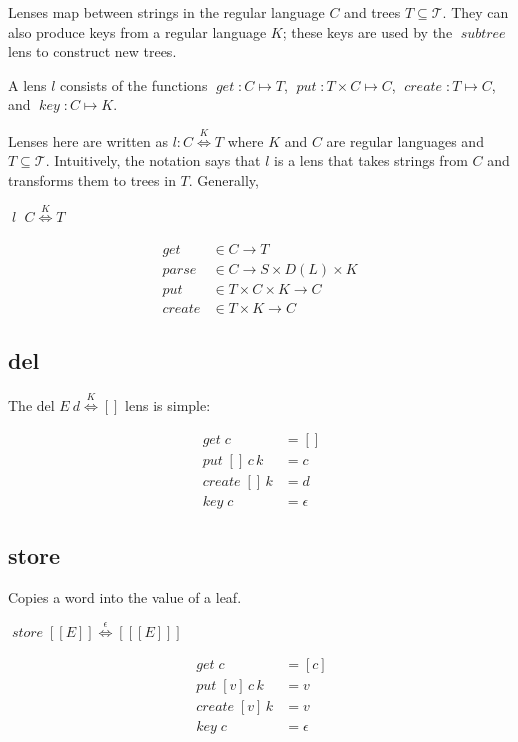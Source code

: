 \documentclass{amsart}
\newcommand{\ensmath}[1]{\ensuremath{#1}\xspace}
\newcommand{\opnam}[1]{\ensmath{\operatorname{\mathit{#1}}}}
\newcommand{\nget}{\opnam{get}}
\newcommand{\nput}{\opnam{put}}
\newcommand{\nparse}{\opnam{parse}}
\newcommand{\ncreate}{\opnam{create}}
\newcommand{\nkey}{\opnam{key}}
\newcommand{\lget}[1]{\opnam{get}{#1}}
\newcommand{\lput}[3]{\opnam{put}{#1}\,{#2}\,{#3}}
\newcommand{\lcreate}[2]{\opnam{create}{#1}\,{#2}}
\newcommand{\lkey}[1]{\nkey{#1}}
\newcommand{\lenstype}[3][K]{\ensmath{{#2}\stackrel{#1}{\Longleftrightarrow}{#3}}}
\newcommand{\tree}[1]{\ensmath{[#1]}}
\newcommand{\niltree}{\ensmath{[]}}
\newcommand{\Regexp}{\ensmath{\mathcal R}}
\newcommand{\reglang}[1]{\ensmath{[\![{#1}]\!]}}
\newcommand{\lens}[1]{\opnam{#1}}
\newcommand{\eps}{\ensmath{\epsilon}}
\newcommand{\Trees}{\ensmath{\mathcal T}}
\newcommand{\Words}{\ensmath{\Sigma^*}}
\newcommand{\lto}{\ensmath{\longrightarrow}}
\begin{document}
Lenses map between strings in the regular language $C$ and trees
$T\subseteq\Trees$. They can also produce keys from a regular language $K$;
these keys are used by the $\lens{subtree}$ lens to construct new trees.

A lens $l$ consists of the functions $\nget : C \mapsto T$, $\nput : T
\times C \mapsto C$, $\ncreate : T \mapsto C$, and $\nkey : C \mapsto K$.

Lenses here are written as $l:\lenstype[K]{C}{T}$ where $K$ and $C$ are
regular languages and $T\subseteq\Trees$. Intuitively, the notation says
that $l$ is a lens that takes strings from $C$ and transforms them to trees
in $T$. Generally,

\infrule{C\subseteq\Words \andalso K\subseteq\Words \andalso T\subseteq\Trees}
        {\lens{l} \in \lenstype[K]{C}{T}}

\begin{align*}
  \nget &\in C \lto T\\
  \nparse &\in C \lto S \times D(L) \times K\\
  \nput &\in T \times C \times K \lto C\\
  \ncreate &\in T \times K \lto C
\end{align*}

\subsection{del}

The del \lenstype{E\:d}{\niltree} lens is simple:

\infrule{E\in\Regexp}{\lens{del} \in \lenstype[\eps]{\reglang{E}}{\niltree}}

\begin{align*}
  \lget{c} &= \niltree\\
  \lput{\niltree}{c}{k} &= c\\
  \lcreate{\niltree}{k} &= d\\
  \lkey{c} &= \eps
\end{align*}

\subsection{store}

Copies a word into the value of a leaf.

\infrule{E\in\Regexp}
        {\lens{store}\in\lenstype[\eps]{\reglang{E}}{\tree{\reglang{E}}}}

\begin{align*}
  \lget{c} &= \tree{c}\\
  \lput{\tree{v}}{c}{k} &= v\\
  \lcreate{\tree{v}}{k} &= v\\
  \lkey{c} &= \eps
\end{align*}
\end{document}
